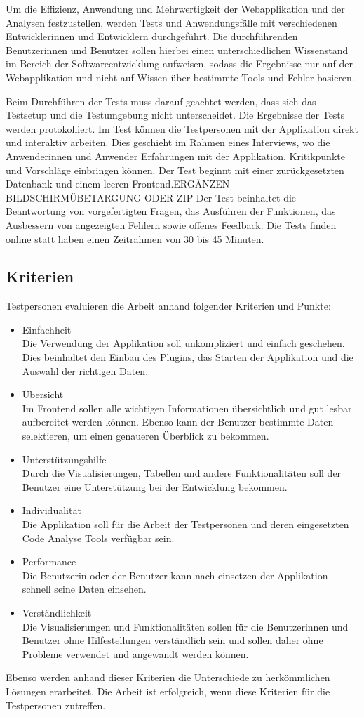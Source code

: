 Um die Effizienz, Anwendung und Mehrwertigkeit der Webapplikation und der Analysen festzustellen, werden Tests und Anwendungsfälle mit verschiedenen Entwicklerinnen und Entwicklern durchgeführt. Die durchführenden Benutzerinnen und Benutzer sollen hierbei einen unterschiedlichen Wissenstand im Bereich der Softwareentwicklung aufweisen, sodass die Ergebnisse nur auf der Webapplikation und nicht auf Wissen über bestimmte Tools und Fehler basieren. 


Beim Durchführen der Tests muss darauf geachtet werden, dass sich das Testsetup und die Testumgebung nicht unterscheidet. Die Ergebnisse der Tests werden protokolliert. Im Test können die Testpersonen mit der Applikation direkt und interaktiv arbeiten. Dies geschieht im Rahmen eines Interviews, wo die Anwenderinnen und Anwender Erfahrungen mit der Applikation, Kritikpunkte und Vorschläge einbringen können. Der Test beginnt mit einer zurückgesetzten Datenbank und einem leeren Frontend.ERGÄNZEN BILDSCHIRMÜBETARGUNG ODER ZIP
Der Test beinhaltet die Beantwortung von vorgefertigten Fragen, das Ausführen der Funktionen, das Ausbessern von angezeigten Fehlern sowie offenes Feedback.
Die Tests finden online statt haben einen Zeitrahmen von 30 bis 45 Minuten. 
\subsection{Kriterien} 
Testpersonen evaluieren die Arbeit anhand folgender Kriterien und Punkte:
\begin{itemize}
\item Einfachheit \\ Die Verwendung der Applikation soll unkompliziert und einfach geschehen. Dies beinhaltet den Einbau des Plugins, das Starten der Applikation und die Auswahl der richtigen Daten.
\item Übersicht \\ Im Frontend sollen alle wichtigen Informationen übersichtlich und gut lesbar aufbereitet werden können. Ebenso kann der Benutzer bestimmte Daten selektieren, um einen genaueren Überblick zu bekommen.
\item Unterstützungshilfe \\ Durch die Visualisierungen, Tabellen und andere Funktionalitäten soll der Benutzer eine Unterstützung bei der Entwicklung bekommen.
\item Individualität \\ Die Applikation soll für die Arbeit der Testpersonen und deren eingesetzten Code Analyse Tools verfügbar sein.
\item Performance \\ Die Benutzerin oder der Benutzer kann nach einsetzen der Applikation schnell seine Daten einsehen.
\item Verständlichkeit \\ Die Visualisierungen und Funktionalitäten sollen für die Benutzerinnen und Benutzer ohne Hilfestellungen verständlich sein und sollen daher ohne Probleme verwendet und angewandt werden können.
\end{itemize}

Ebenso werden anhand dieser Kriterien die Unterschiede zu herkömmlichen Lösungen erarbeitet. Die Arbeit ist erfolgreich, wenn diese Kriterien für die Testpersonen zutreffen. 


